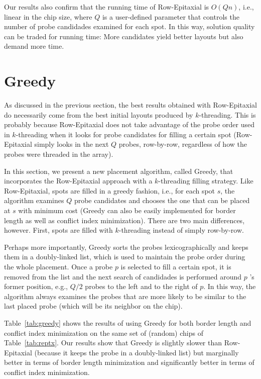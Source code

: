 Our results also confirm that the running time of Row-Epitaxial is $O(Qn)$,
i.e., linear in the chip size, where $Q$ is a user-defined parameter that
controls the number of probe candidades examined for each spot. In this way,
solution quality can be traded for running time: More candidates yield better
layouts but also demand more time.

\section{Greedy}
\label{sec:placement_greedy}

As discussed in the previous section, the best results obtained with
Row-Epitaxial do necessarily come from the best initial layouts produced by
$k$-threading. This is probably because Row-Epitaxial does not take advantage of
the probe order used in $k$-threading when it looks for probe candidates for
filling a certain spot (Row-Epitaxial simply looks in the next $Q$ probes,
row-by-row, regardless of how the probes were threaded in the array).

In this section, we present a new placement algorithm, called Greedy, that
incorporates the Row-Epitaxial approach with a $k$-threading filling strategy.
Like Row-Epitaxial, spots are filled in a greedy fashion, i.e., for each spot
$s$, the algorithm examines $Q$ probe candidates and chooses the one that can be
placed at $s$ with minimum cost (Greedy can also be easily implemented for
border length as well as conflict index minimization). There are two main
differences, however. First, spots are filled with $k$-threading instead of
simply row-by-row.

Perhaps more importantly, Greedy sorts the probes lexicographically and keeps
them in a doubly-linked list, which is used to maintain the probe order during
the whole placement. Once a probe $p$ is selected to fill a certain spot, it is
removed from the list and the next search of candidades is performed around $p$
's former position, e.g., $Q/2$ probes to the left and to the right of $p$. In
this way, the algorithm always examines the probes that are more likely to be
similar to the last placed probe (which will be its neighbor on the chip).

Table~\ref{tab:greedy} shows the results of using Greedy for both border length
and conflict index minimization on the same set of (random) chips of
Table~\ref{tab:reptx}. Our results show that Greedy is slightly slower than
Row-Epitaxial (because it keeps the probe in a doubly-linked list) but
marginally better in terms of border length minimization and significantly
better in terms of conflict index minimization.

